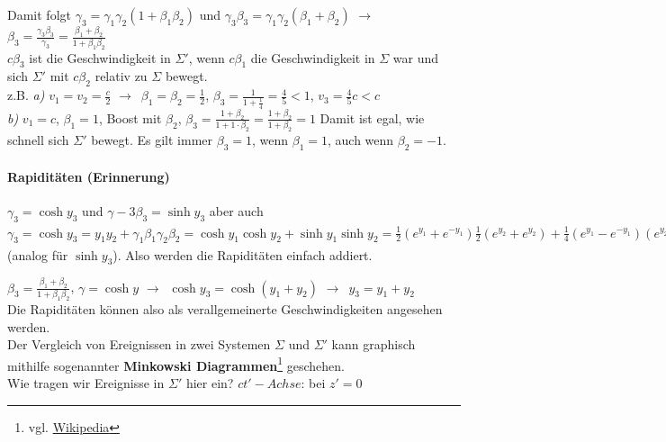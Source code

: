\documentclass[oneside]{book}
\theoremstyle{definition}
\newcommand{\conseq}{$\rightarrow$~}
\begin{document}
Damit folgt $\gamma_3 = \gamma_1 \gamma_2 (1 + \beta_1 \beta_2)$ und $\gamma_3 \beta_3 = \gamma_1 \gamma_2 (\beta_1 + \beta_2)$ \conseq $\beta_3 = \frac{\gamma_3 \beta_3}{\gamma_3} = \frac{\beta_1 + \beta_2}{1 + \beta_1 \beta_2}$\\
$c \beta_3$ ist die Geschwindigkeit in $\Sigma'$, wenn $c\beta_1$ die Geschwindigkeit in $\Sigma$ war und sich $\Sigma'$ mit $c\beta_2$ relativ zu $\Sigma$ bewegt.
~\\
z.B. \textit{a)} $v_1 = v_2 = \frac{c}{2}$ \conseq $\beta_1 = \beta_2 = \frac12$, $\beta_3 = \frac{1}{1 + \frac14} = \frac45 < 1$, $v_3 = \frac45 c < c$\\
\textit{b)} $v_1 = c$, $\beta_1 = 1$, Boost mit $\beta_2$, $\beta_3 = \frac{1 + \beta_2}{1 + 1 \cdot \beta_2} = \frac{1 + \beta_2}{1 + \beta_2} = 1$ Damit ist egal, wie schnell sich $\Sigma'$ bewegt. Es gilt immer $\beta_3 = 1$, wenn $\beta_1 = 1$, auch wenn $\beta_2 = -1$.

\paragraph{Rapiditäten (Erinnerung)} $\gamma_3 = \cosh y_3$ und $\gamma-3 \beta_3 = \sinh y_3$
aber auch $\gamma_3 = \cosh y_3 = y_1 y_2 + \gamma_1 \beta_1 \gamma_2 \beta_2 = \cosh y_1 \cosh y_2 + \sinh y_1 \sinh y_2 = \frac12 (e^{y_1} + e^{-y_1}) \frac12 (e^{y_2} + e^{y_2}) + \frac14 (e^{y_1} - e^{- y_1}) (e^{y_2} - e^{-y_2}) = \frac14 (e^{y_1} e^{y_2} + e^{y_1} e^{-y_2} + e^{-y_1} e^{y_2} + e^{-y_1} e^{-y_2} + e^{y_1} e^{y_2} - e^{y_1} e^{-y_2} - e^{-y_1} e^{y_2} - e^{-y_1} e^{-y_2}) = \frac14 (2 e^{y_1} e^{y_2} + 2 e^{-y_1} e^{-y_2}) = \frac12 (e^{y_1 + y_2} + e^{-(y_1 + y_2)}) = \cosh (y_1 + y_2) = \cosh y_3$ (analog für $\sinh y_3$). Also werden die Rapiditäten einfach addiert.


$\beta_3 = \frac{\beta_1 + \beta_2}{1 + \beta_1 \beta_2}$, $\gamma = \cosh y$ \conseq $\cosh y_3 = \cosh(y_1 + y_2)$ \conseq $y_3 = y_1 + y_2$\\
Die Rapiditäten können also als verallgemeinerte Geschwindigkeiten angesehen werden.\\
Der Vergleich von Ereignissen in zwei Systemen $\Sigma$ und $\Sigma'$ kann graphisch mithilfe sogenannter \textbf{Minkowski Diagrammen}\footnote{vgl. \href{https://de.wikipedia.org/wiki/Minkowski-Diagramm}{Wikipedia}} geschehen.\\
Wie tragen wir Ereignisse in $\Sigma'$ hier ein?
$ct'-Achse$: bei $z' = 0$\\
\end{document}
